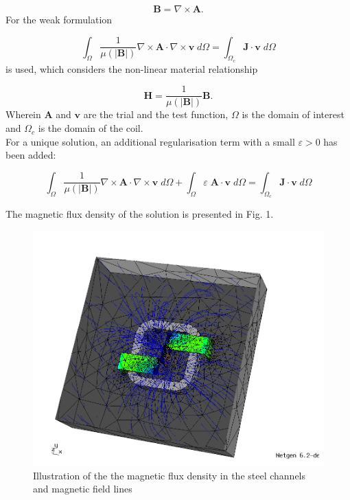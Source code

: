 \documentclass[11pt]{article}
\makeatletter
\def\maxwidth{\ifdim\Gin@nat@width>\linewidth\linewidth
    \else\Gin@nat@width\fi}
\let\Oldincludegraphics\includegraphics
\renewcommand{\includegraphics}[1]{\Oldincludegraphics[width=.8\maxwidth]{#1}}
\makeatother
\begin{document}
     \begin{equation}
        \textbf{B} =  \nabla \times \textbf{A}.
    \end{equation}
For the weak formulation

    \begin{equation}
        \int_\Omega \frac{1}{\mu(|\textbf{B}|)}\nabla\times \textbf{A}\cdot \nabla\times\textbf{v}\; d\Omega = \int_{\Omega_c} \textbf{J}\cdot \textbf{v}\;d\Omega 
    \end{equation}
is used, which considers the non-linear material relationship


    \begin{equation}
        \textbf{H} =  \frac{1}{\mu(|\textbf{B}|)}\textbf{B}.
    \end{equation}
Wherein \(\textbf{A}\) and \(\textbf{v}\) are the trial and the test
function, \(\Omega\) is the domain of interest and \(\Omega_c\) is the
domain of the coil.\\
For a unique solution, an additional regularisation term with a small
\(\varepsilon > 0\) has been added:


    \begin{equation}
        \int_\Omega \frac{1}{\mu(|\textbf{B}|)}\nabla\times \textbf{A}\cdot \nabla\times\textbf{v}\; d\Omega + \int_\Omega\varepsilon\;\textbf{A}\cdot\textbf{v}\;d\Omega= \int_{\Omega_c} \textbf{J}\cdot \textbf{v}\;d\Omega              
    \end{equation}


The magnetic flux density of the solution is presented in Fig. 1.

\begin{figure}[h]
	\centering
	\includegraphics{halfmodel.jpg}
	\caption{Illustration of the the magnetic flux density in the steel
channels and magnetic field lines}
	\label{fig1}
\end{figure}
   
\end{document}
